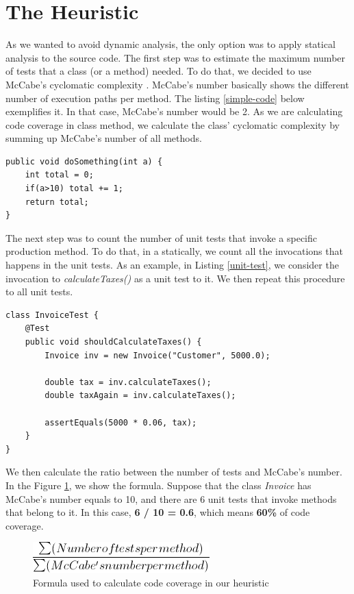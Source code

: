 \documentclass{sig-alternate}
\begin{document}
\section{The Heuristic}

As we wanted to avoid dynamic analysis, the only option was to apply statical analysis to
the source code. The first step was to estimate the maximum number of tests that a class
(or a method) needed. To do that, we decided to use McCabe's cyclomatic complexity \cite{mccabe}.
McCabe's number basically shows the different number of execution paths per method. The listing
\ref{simple-code} below exemplifies it. In that case, McCabe's number would be 2.
As we are calculating code coverage in class method, we calculate the class' cyclomatic complexity
by summing up McCabe's number of all methods.

\begin{lstlisting}
public void doSomething(int a) {
	int total = 0;
	if(a>10) total += 1;
	return total;
}
\end{lstlisting}

The next step was to count the number of unit tests that invoke a specific production method. To do that,
in a statically, we count all the invocations that happens in the unit tests. As an example, in Listing
\ref{unit-test}, we consider the invocation to \textit{calculateTaxes()} as a unit test to it.
We then repeat this procedure to all unit tests.

\begin{lstlisting}
class InvoiceTest {
	@Test
	public void shouldCalculateTaxes() {
		Invoice inv = new Invoice("Customer", 5000.0);

		double tax = inv.calculateTaxes();
		double taxAgain = inv.calculateTaxes();
		
		assertEquals(5000 * 0.06, tax);
	}
}
\end{lstlisting}

We then calculate the ratio between the number of tests and 
McCabe's number. In the Figure \ref{fig:formula}, we show the formula.
Suppose that the class \textit{Invoice} has McCabe's number equals to 10, and there are 6 unit tests
that invoke methods that belong to it.  
In this case, \textbf{6 / 10 = 0.6}, which means \textbf{60\%} of code coverage.


	\begin{figure}[h!H]
	  \centering
	  \includegraphics[scale=0.6]{imgs/formula.png}
	  \caption{Formula used to calculate code coverage in our heuristic}
	  \label{fig:formula}
	\end{figure}
\end{document}
